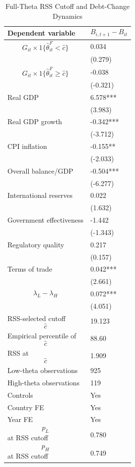 \begin{table}[H]\centering
\begin{threeparttable}
\caption{Full-Theta RSS Cutoff and Debt-Change Dynamics}
\label{tab:deltaB_rss_cutoff_fulltheta}
\scriptsize
\begin{tabularx}{\textwidth}{lY}
\toprule
Dependent variable & $$B_{i,t+1}-B_{it}$$ \\
\midrule
$$G_{it}\times 1\{\widehat{\theta}^{F}_{it}<\widehat{c}\}$$ & 0.034 \\
 & (0.279) \\
$$G_{it}\times 1\{\widehat{\theta}^{F}_{it}\geq\widehat{c}\}$$ & -0.038 \\
 & (-0.321) \\
Real GDP & 6.578*** \\
 & (3.983) \\
Real GDP growth & -0.342*** \\
 & (-3.712) \\
CPI inflation & -0.155** \\
 & (-2.033) \\
Overall balance/GDP & -0.504*** \\
 & (-6.277) \\
International reserves & 0.022 \\
 & (1.632) \\
Government effectiveness & -1.442 \\
 & (-1.343) \\
Regulatory quality & 0.217 \\
 & (0.157) \\
Terms of trade & 0.042*** \\
 & (2.661) \\
$$\lambda_L-\lambda_H$$ & 0.072*** \\
 & (4.051) \\
\midrule
RSS-selected cutoff $$\widehat{c}$$ & 19.123 \\
Empirical percentile of $$\widehat{c}$$ & 88.60 \\
RSS at $$\widehat{c}$$ & 1.909 \\
Low-theta observations & 925 \\
High-theta observations & 119 \\
Controls & Yes \\
Country FE & Yes \\
Year FE & Yes \\
$$p_L$$ at RSS cutoff & 0.780 \\
$$p_H$$ at RSS cutoff & 0.749 \\

\end{tabularx}
\end{threeparttable}
\end{table}
